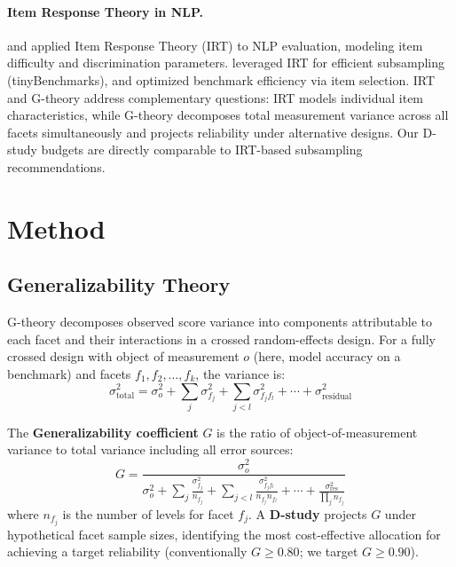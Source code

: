 \documentclass[11pt]{article}
\begin{document}
\paragraph{Item Response Theory in NLP.}
\citet{lalor2019learning} and \citet{rodriguez2021evaluation} applied Item Response Theory (IRT) to NLP evaluation, modeling item difficulty and discrimination parameters.
\citet{polo2024tinybenchmarks} leveraged IRT for efficient subsampling (tinyBenchmarks), and \citet{perlitz2023efficient} optimized benchmark efficiency via item selection.
IRT and G-theory address complementary questions: IRT models individual item characteristics, while G-theory decomposes total measurement variance across all facets simultaneously and projects reliability under alternative designs.
Our D-study budgets are directly comparable to IRT-based subsampling recommendations.


\section{Method}

\subsection{Generalizability Theory}

G-theory decomposes observed score variance into components attributable to each facet and their interactions in a crossed random-effects design.
For a fully crossed design with object of measurement $o$ (here, model accuracy on a benchmark) and facets $f_1, f_2, \ldots, f_k$, the variance is:
\begin{equation}
\sigma^2_{\text{total}} = \sigma^2_o + \sum_j \sigma^2_{f_j} + \sum_{j<l} \sigma^2_{f_j f_l} + \cdots + \sigma^2_{\text{residual}}
\end{equation}

The \textbf{Generalizability coefficient} $G$ is the ratio of object-of-measurement variance to total variance including all error sources:
\begin{equation}
G = \frac{\sigma^2_o}{\sigma^2_o + \sum_{j} \frac{\sigma^2_{f_j}}{n_{f_j}} + \sum_{j<l}\frac{\sigma^2_{f_jf_l}}{n_{f_j}n_{f_l}} + \cdots + \frac{\sigma^2_{\text{res}}}{\prod_j n_{f_j}}}
\end{equation}
where $n_{f_j}$ is the number of levels for facet $f_j$.
A \textbf{D-study} projects $G$ under hypothetical facet sample sizes, identifying the most cost-effective allocation for achieving a target reliability (conventionally $G \geq 0.80$; we target $G \geq 0.90$).
\end{document}
